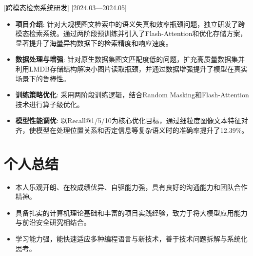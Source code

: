 \documentclass{resume}
\begin{document}
[跨模态检索系统研发]
[2024.03—2024.05]
\begin{itemize}
  \item \textbf{项目介绍}: 针对大规模图文检索中的语义失真和效率瓶颈问题，独立研发了跨模态检索系统。通过两阶段预训练并引入了Flash-Attention和优化存储方案，显著提升了海量异构数据下的检索精度和响应速度。
  \item \textbf{数据处理与增强}: 针对原生数据集图文匹配度低的问题，扩充高质量数据集并利用LMDB存储结构解决小图片读取瓶颈，并通过数据增强提升了模型在真实场景下的鲁棒性。
  \item \textbf{训练策略优化}: 采用两阶段训练逻辑，结合Random Masking和Flash-Attention技术进行算子级优化。
  \item \textbf{模型性能调优}: 以Recall@1/5/10为核心优化目标，通过细粒度图像文本特征对齐，使模型在处理位置关系和否定信息等复杂语义时的准确率提升了12.39\%。
\end{itemize}

\section{个人总结}

\begin{itemize}
  \item 本人乐观开朗、在校成绩优异、自驱能力强，具有良好的沟通能力和团队合作精神。
  \item 具备扎实的计算机理论基础和丰富的项目实践经验，致力于将大模型应用能力与前沿安全研究相结合。
  \item 学习能力强，能快速适应多种编程语言与新技术，善于技术问题拆解与系统化思考。
\end{itemize}
\end{document}
